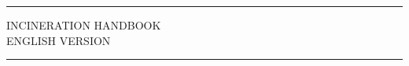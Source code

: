 
\AddToShipoutPicture{\BackgroundPic}

\vspace*{5cm}


\hrule \medskip %
\centering
\huge{INCINERATION HANDBOOK} \\
\normalsize 
\huge{ENGLISH VERSION}\\ 
\medskip\hrule 
\bigskip




